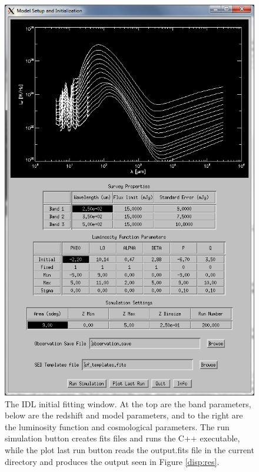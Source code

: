 \documentclass[twocolumn,letterpaper,10pt]{article}
\begin{document}
\begin{onecolumn}
\begin{figure}
  \centering
  \includegraphics[width=5 in]{initial.png}
  \caption{The IDL initial fitting window. At the top are the band parameters, below are the redshift and model parameters, and to the right are the luminosity function and cosmological parameters. The run simulation button creates fits files and runs the C++ executable, while the plot last run button reads the output.fits file in the current directory and produces the output seen in Figure \ref{disp:res}.}
  \label{disp:init}
\end{figure}


\end{onecolumn}
\end{document}
